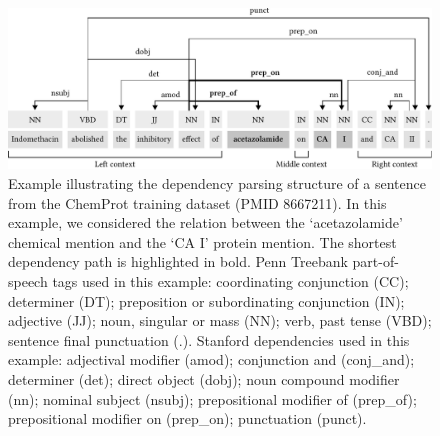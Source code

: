 
\begin{figure}[!tb]
\centerline{\includegraphics[width=\textwidth]{img/chemprot-sdp/v2/img.pdf}}
\caption[Example illustrating the dependency parsing structure of a sentence.]%
{Example illustrating the dependency parsing structure of a sentence from the ChemProt training dataset (PMID 8667211). In this example, we considered the relation between the `acetazolamide' chemical mention and the `CA I' protein mention. The shortest dependency path is highlighted in bold. Penn Treebank part-of-speech tags \parencite{marcus1993a} used in this example: coordinating conjunction (CC); determiner (DT); preposition or subordinating conjunction (IN); adjective (JJ); noun, singular or mass (NN); verb, past tense (VBD); sentence final punctuation (.). Stanford dependencies \parencite{marneffe2016a} used in this example: adjectival modifier (amod); conjunction and (conj\_and); determiner (det); direct object (dobj); noun compound modifier (nn); nominal subject (nsubj); prepositional modifier of (prep\_of); prepositional modifier on (prep\_on); punctuation (punct).}
\label{fig:chemprot-sdp}
\end{figure}
